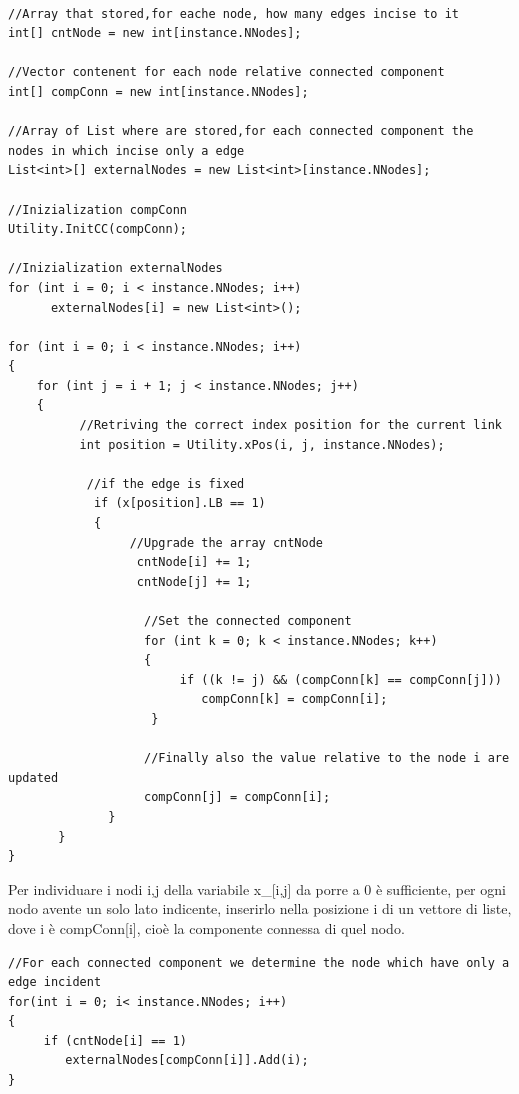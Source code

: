\documentclass[11pt]{article}
\begin{document}
\begin{lstlisting} 
 
//Array that stored,for eache node, how many edges incise to it 
int[] cntNode = new int[instance.NNodes];
            
//Vector contenent for each node relative connected component
int[] compConn = new int[instance.NNodes];

//Array of List where are stored,for each connected component the nodes in which incise only a edge
List<int>[] externalNodes = new List<int>[instance.NNodes];

//Inizialization compConn
Utility.InitCC(compConn);

//Inizialization externalNodes
for (int i = 0; i < instance.NNodes; i++)
      externalNodes[i] = new List<int>();

for (int i = 0; i < instance.NNodes; i++)
{
    for (int j = i + 1; j < instance.NNodes; j++)
    {
          //Retriving the correct index position for the current link 
          int position = Utility.xPos(i, j, instance.NNodes);

           //if the edge is fixed 
            if (x[position].LB == 1)
            {
                 //Upgrade the array cntNode
                  cntNode[i] += 1;
                  cntNode[j] += 1;

                   //Set the connected component 
                   for (int k = 0; k < instance.NNodes; k++)
                   {
                        if ((k != j) && (compConn[k] == compConn[j]))
                           compConn[k] = compConn[i];                          
                    }

                   //Finally also the value relative to the node i are updated
                   compConn[j] = compConn[i];                                                                        
              }
       }
}
\end{lstlisting}
  
Per individuare i nodi i,j della variabile x_[i,j] da porre a 0 è sufficiente, per ogni nodo avente un solo lato indicente, inserirlo nella posizione i di un vettore di liste, dove i è compConn[i], cioè la componente connessa di quel nodo.
  
\begin{lstlisting}    
//For each connected component we determine the node which have only a edge incident 
for(int i = 0; i< instance.NNodes; i++)
{
     if (cntNode[i] == 1)
        externalNodes[compConn[i]].Add(i);
}
\end{lstlisting}
\end{document}
